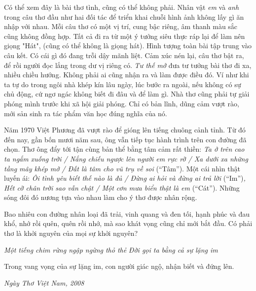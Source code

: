 \documentclass[../main.tex]{subfiles}
\begin{document}
\begin{multicols}{2}
Có thể xem đây là bài thơ tình, cũng có thể không phải. Nhân vật \textit{em} và \textit{anh} trong câu thơ đầu như hai đối tác để triển khai chuỗi hình ảnh không lấy gì ăn nhập với nhau. Mỗi câu thơ có một vị trí, cung bậc riêng, âm thanh màu sắc cũng không đồng hợp. Tất cả đi ra từ một ý tưởng siêu thực ráp lại để làm nên giọng "Hát", (cũng có thể không là giọng hát). Hình tượng toàn bài tập trung vào câu kết. Có cái gì đó đang trỗi dậy mãnh liệt. Cảm xúc nén lại, câu thơ bật ra, để rồi người đọc lắng trong dư vị riêng có. \textit{Tư thế mở} đưa tư tưởng bài thơ đi xa, nhiều chiều hướng. Không phải ai cũng nhận ra và làm được điều đó. Ví như khi ta tự do trong ngôi nhà khép kín lâu ngày, lúc bước ra ngoài, nếu không có sự chủ động, cứ ngơ ngác không biết đi đâu và để làm gì. Nhà thơ cũng phải tự giải phóng mình trước khi xã hội giải phóng. Chỉ có bản lĩnh, dũng cảm vượt rào, mới sản sinh ra tác phẩm văn học đúng nghĩa của nó. 
 
Năm 1970 Việt Phương đã vượt rào để gióng lên tiếng chuông cảnh tỉnh. Từ đó đến nay, gần bốn mươi năm sau, ông vẫn tiếp tục hành trình trên con đường đã chọn. Thơ ông đẩy tới tận cùng bản thể bằng tâm cảm rất thiền: \textit{Ta ở trên cao ta ngắm xuống trời / Nắng chiếu ngược lên người em rực rỡ / Xa dưới xa những tầng mây khép mở / Đất là tâm cho vũ trụ về soi }(“Tâm”). Một cái nhìn thật luyến ái: \textit{Ôi tình yêu biết thế nào là đủ / Đừng ai hỏi và đừng ai trả lời }(“Im”)\textit{, Hết cỡ chân trời sao vẫn chật / Một cơn mưa biển thật là em }(“Cát”). Những sóng đôi đó nương tựa vào nhau làm cho ý thơ được nhân rộng.  
 
Bao nhiêu con đường nhân loại đã trải, vinh quang và đen tối, hạnh phúc và đau khổ, nhớ rồi quên, quên rồi nhớ, mà sao khát vọng cũng chỉ mới bắt đầu. Có phải thơ là khởi nguyên của mọi sự khởi nguyên? 
    \begin{blockquote}
                               
\textit{Một tiếng chim rừng ngập ngừng thỏ thẻ} 
\textit{Đời gọi ta bằng cả sự lặng im} 
\textit{  }
\end{blockquote}

\textit{           } 
Trong vang vọng của sự lặng im, con người giác ngộ, nhận biết và đứng lên.  
                                                                                                 
\textit{Ngày Thơ Việt Nam, 2008} 
\end{multicols}
\end{document}

